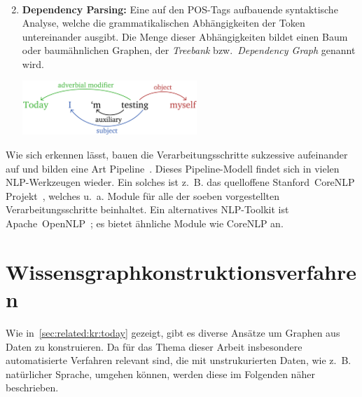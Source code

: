 \begin{enumerate}
\begin{align*}
		\end{align*}
	\item \textbf{Dependency Parsing:}
		Eine auf den POS-Tags aufbauende syntaktische Analyse, welche die grammatikalischen Abhängigkeiten der Token untereinander ausgibt.
		Die Menge dieser Abhängigkeiten bildet einen Baum oder baumähnlichen Graphen, der \textit{Treebank} bzw.\ \textit{Dependency Graph} genannt wird.
		\begin{center}
			\includegraphics[height=5.5em]{gfx/related-work/depParseExample1.pdf}
		\end{center}
\end{enumerate}

Wie sich erkennen lässt, bauen die Verarbeitungsschritte sukzessive aufeinander auf und bilden eine Art Pipeline~\cite{Pipeline}.
Dieses Pipeline-Modell findet sich in vielen NLP-Werkzeugen wieder.
Ein solches ist z.~B. das quelloffene Stanford~CoreNLP Projekt~\cite{Manning2014}\cite{CoreNLP}, welches u.~a. Module für alle der soeben vorgestellten Verarbeitungsschritte beinhaltet.
Ein alternatives NLP-Toolkit ist Apache~OpenNLP~\cite{OpenNLP};\@
es bietet ähnliche Module wie CoreNLP an.

\section{Wissensgraphkonstruktionsverfahren}%
\label{sec:related:kgc}

Wie in~\ref{sec:related:kr:today} gezeigt, gibt es diverse Ansätze um Graphen aus Daten zu konstruieren.
Da für das Thema dieser Arbeit insbesondere automatisierte Verfahren relevant sind, die mit unstrukurierten Daten, wie z.~B. natürlicher Sprache, umgehen können, werden diese im Folgenden näher beschrieben.

